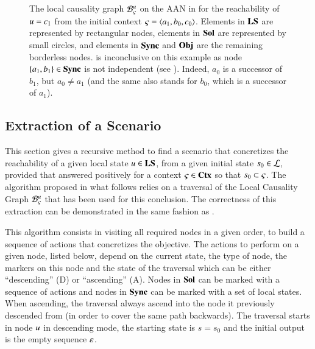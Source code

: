 \begin{example}
\begin{figure}[tp]
  \caption{
  \label{fig:sa-livelock}
    The local causality graph ${\mathcal{B}_{\varsigma}^{u}}$ on the AAN in 
    for the reachability of $u = c_1$
    from the initial context $\varsigma = \mbox{$\langle a_1, b_0, c_0 \rangle$}$.
    Elements in $\mathbf{LS}$ are represented by rectangular nodes,
    elements in $\mathbf{Sol}$ are represented by small circles,
    and elements in $\mathbf{Sync}$ and $\mathbf{Obj}$ are the remaining borderless nodes.
     is inconclusive on this example as
    node $\{ a_1, b_1 \} \in \mathbf{Sync}$
    is not independent (see ).
    Indeed, $a_0$ is a successor of $b_1$, but $a_0 \neq a_1$
    (and the same also stands for $b_0$, which is a successor of $a_1$).
  }
\end{figure}
\end{example}



\subsection{Extraction of a Scenario}
\label{ssec:concret}

This section gives a recursive method to find a scenario that concretizes
the reachability of a given local state $u \in \mathbf{LS}$,
from a given initial state $s_0 \in \mathcal{L}$,
provided that  answered positively
for a context $\varsigma \in \mathbf{Ctx}$ so that $s_0 \subset \varsigma$.
The algorithm proposed in what follows relies on a traversal of the Local Causality Graph
${\mathcal{B}_{\varsigma}^{u}}$ that has been used for this conclusion.
The correctness of this extraction can be demonstrated
in the same fashion as .

This algorithm consists in visiting all required nodes in a given order,
to build a sequence of actions that concretizes the objective.
The actions to perform on a given node,
listed below,
depend on the current state, the type of node, the markers on this node
and the state of the traversal which can be either “descending” (D) or “ascending” (A).
Nodes in $\mathbf{Sol}$ can be marked with a sequence of actions
and nodes in $\mathbf{Sync}$ can be marked with a set of local states.
When ascending, the traversal always ascend into the node it previously descended from
(in order to cover the same path backwards).
The traversal starts in node $u$ in descending mode,
the starting state is $s = s_0$
and the initial output is the empty sequence $\varepsilon$.


